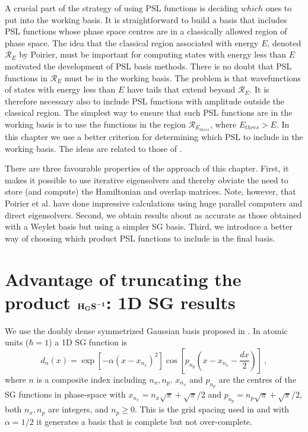 A crucial part of the strategy of using PSL functions is deciding $which$ ones to put into the working basis.  It is straightforward to build a basis that includes
PSL functions whose phase space centres are in a    classically allowed region of phase space.   
   The idea that the  classical region associated with energy $E$, denoted $\mathcal{R}_E 
$  
by Poirier,  
 must be important  for computing states with energy less than $E$ motivated  the 
development of PSL basis methods.    There is no doubt that 
 PSL functions  in    $\mathcal{R}_E $   must be in the working basis.   The problem is that wavefunctions of states with energy less %
%
 than $E$ have tails that 
extend beyond      $\mathcal{R}_E $.  
     It is therefore necessary also to include PSL functions with amplitude outside  the classical region.   The  simplest  way to ensure  that such 
PSL functions are in the working basis is to  use the functions in the region 
 $\mathcal{R}_{E_{thres}}$, 
 where $  {E_{thres}} >  E$.      
 In this chapter we use a better criterion for determining which 
PSL to include in the working basis.   The ideas are related to those of .  




There are three favourable properties of  the approach of this chapter. 
  First, it  makes it possible to use iterative eigensolvers and thereby obviate the need to store (and compute) the Hamiltonian and overlap  matrices.  Note, however, that 
 Poirier et al. have done impressive calculations using huge parallel computers and direct eigensolvers.\cite{Halverson2012,Poirier2004b}
%
  Second,  we obtain results about as accurate as those obtained
with a Weylet basis but using  a  simpler SG basis.  Third,  we introduce a better way of choosing which product PSL functions to include in the final basis. 











\section{Advantage of truncating the product  ${\bf{ H_G S^{-1}}}$:       1D  SG results\label{Sec.chop}}

We  use the doubly dense symmetrized Gaussian basis proposed 
%
in  .  In  atomic units ($\hbar=1$) a 1D SG function is 
\begin{equation}
d_n\left(x\right)=\exp\left[-\alpha\left(x-
x_{n_x}\right)^2\right]\cos\left[p_{n_p}\left(x-x_{n_x}-\dfrac{dx}{2}\right)\right] ~,   
\end{equation} 
where $n$ is a composite index including  $n_x,n_p$.  $x_{n_x}$ and $p_{n_p}$ are the centres of 
the SG functions in phase-space with $x_{n_x}=n_x\sqrt{\pi}+\sqrt{\pi}/2$ and  
$p_{n_p}=n_p\sqrt{\pi}+\sqrt{\pi}/2$,  both $n_x,n_p$  are  integers, and $n_p\geq0$.  
This is the grid spacing used in  and with $\alpha=1/2$ 
it generates  a basis that is complete but not over-complete. 


